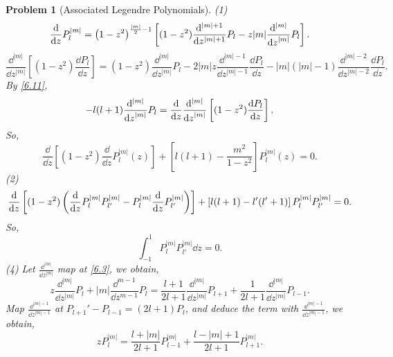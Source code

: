 \documentclass{article}
\theoremstyle{1}
\newtheorem{problem}{Problem}
\begin{document}
\begin{problem}[Associated Legendre Polynomials]
    (1) 
    \begin{equation}
        \dv{z} P^{|m|}_l=\left(1-z^2\right)^{\frac{|m|}{2}-1}\left[(1-z^2)\frac{\dd^{|m|+1}}{\dd{z^{|m|+1}}}P_l-z|m|\frac{\dd^{|m|}}{\dd{z}^{|m|}}P_l\right].
    \end{equation}
    {\small
    \begin{equation}
        \frac{\dd^{|m|}}{\dd{z}^{|m|}}\left[(1-z^2)\frac{\dd{P_l}}{\dd{z}}\right]=(1-z^2)\frac{\dd^{|m|}}{\dd{z}^{|m|}}P_l-2|m|z\frac{\dd^{|m|-1}}{\dd{z}^{|m|-1}}\frac{\dd{P_l}}{\dd{z}}-|m|(|m|-1)\frac{\dd^{|m|-2}}{\dd{z}^{|m|-2}}\frac{\dd{P_l}}{\dd{z}}.
    \end{equation}
    }
    By \eqref{6.11},
    \begin{equation}
        -l(l+1)\frac{\dd^{|m|}}{\dd{z}^{|m|}}P_l=\dv{z}\frac{\dd^{|m|}}{\dd{z}^{|m|}}\left[(1-z^2)\frac{\dd{P_l}}{\dd{z}}\right].
    \end{equation}
    So,
    \begin{equation}
        \frac{\dd}{\dd z } \left[ (1 - z^2) \frac{\dd}{\dd z} P_l^{|m|}(z) \right] + \left[ l(l + 1) - \frac{m^2}{1 - z^2} \right] P_l^{|m|}(z) = 0.
    \end{equation}
    (2) {\small
    \begin{equation}
        \dv{z}\left[(1-z^2)\left(\dv{z}P_l^{|m|}P_{l'}^{|m|}-P_l^{|m|}\dv{z}P_{l'}^{|m|}\right)\right]+\left[l(l+1)-l'(l'+1)\right]P_l^{|m|}P_{l'}^{|m|}=0.
    \end{equation}}
    So,
    \begin{equation}
        \int_{-1}^{1}P_l^{|m|}P_{l'}^{|m|}\dd{z}=0.
    \end{equation}
    (4) Let $\frac{\dd^{|m|}}{\dd{z}^{|m|}}$ map at \eqref{6.3}, we obtain, 
    \begin{equation}
        z\frac{\dd^{|m|}}{\dd{z}^{|m|}}P_l+|m|\frac{\dd^{m-1}}{\dd{z}^{m-1}}P_l=\frac{l+1}{2l+1}\frac{\dd^{|m|}}{\dd{z}^{|m|}}P_{l+1}+\frac{1}{2l+1}\frac{\dd^{|m|}}{\dd{z}^{|m|}}P_{l-1}.
    \end{equation}
    Map $\frac{\dd^{|m|-1}}{\dd{z}^{|m|-1}}$ at $P_{l+1}'-P_{l-1}=(2l+1)P_l$, and deduce the term with $\frac{\dd^{|m|-1}}{\dd{z}^{|m|-1}}$, we obtain,
    \begin{equation}
        zP_l^{|m|}=\frac{l+|m|}{2l+1}P_{l-1}^{|m|}+\frac{l-|m|+1}{2l+1}P_{l+1}^{|m|}.
    \end{equation}
\end{problem}
\end{document}
